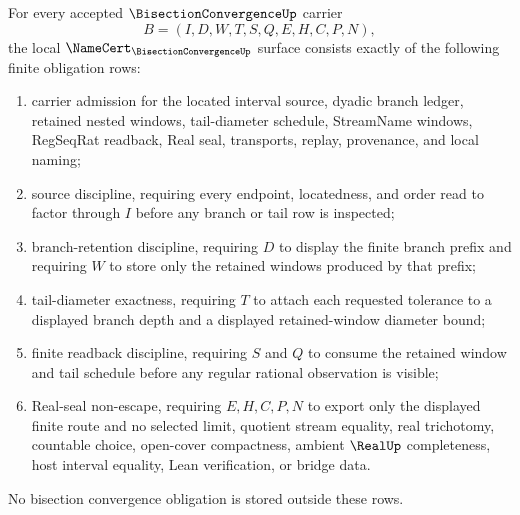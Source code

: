 \begin{theorem}
\label{thm:bisection-convergence-namecert-obligations}
For every accepted $\BisectionConvergenceUp$ carrier
$$
B=(I,D,W,T,S,Q,E,H,C,P,N),
$$
the local $\NameCert_{\BisectionConvergenceUp}$ surface consists exactly of the following finite obligation rows:
\begin{enumerate}
\item carrier admission for the located interval source, dyadic branch ledger, retained nested windows, tail-diameter schedule, StreamName windows, RegSeqRat readback, Real seal, transports, replay, provenance, and local naming;
\item source discipline, requiring every endpoint, locatedness, and order read to factor through $I$ before any branch or tail row is inspected;
\item branch-retention discipline, requiring $D$ to display the finite branch prefix and requiring $W$ to store only the retained windows produced by that prefix;
\item tail-diameter exactness, requiring $T$ to attach each requested tolerance to a displayed branch depth and a displayed retained-window diameter bound;
\item finite readback discipline, requiring $S$ and $Q$ to consume the retained window and tail schedule before any regular rational observation is visible;
\item Real-seal non-escape, requiring $E,H,C,P,N$ to export only the displayed finite route and no selected limit, quotient stream equality, real trichotomy, countable choice, open-cover compactness, ambient $\RealUp$ completeness, host interval equality, Lean verification, or bridge data.
\end{enumerate}
No bisection convergence obligation is stored outside these rows.
\end{theorem}
